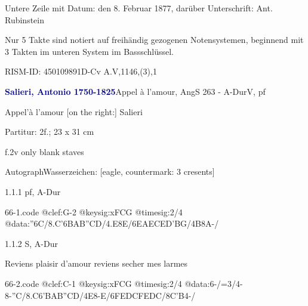 \documentclass[a4paper, twocolumn, 11pt]{book}
\begin{document}
\newline %
\par Untere Zeile mit Datum: {\textquotedbl}den 8. Februar 1877{\textquotedbl}, darüber Unterschrift: {\textquotedbl}Ant. Rubinstein{\textquotedbl}
\par Nur 5 Takte sind notiert auf freihändig gezogenen Notensystemen, beginnend mit 3 Takten im unteren System im Bassschlüssel.
\par RISM-ID: 450109891\newline D-Cv  A.V,1146,(3),1
\par \vspace{16pt} \textcolor{darkblue}{\textbf{Salieri, Antonio  1750-1825}}\hfillplus{[66]}\newline Appel à l'amour, AngS 263 - A-Dur\newline V, pf
\par \begin{itshape}[heading:] Appel'à l'amour [on the right:] Salieri\end{itshape} 
\par \textcolor{darkblue}{}  Partitur: 2f.; 23 x 31 cm\newline \begin{small} f.2v only blank staves\end{small} \newline Autograph\newline Wasserzeichen: [eagle, countermark: 3 cresents]
\par 1.1.1  pf, A-Dur  
\begin{filecontents*}{66-1.code}
@clef:G-2
@keysig:xFCG
@timesig:2/4
@data:''6C/{8.C'6B}{AB''CD}/4.E8E/6{EAEC}{ED'BG}/4B8A-/
\end{filecontents*}

\newline %
\par 1.1.2  S, A-Dur\newline \begin{footnotesize} Reviens plaisir d'amour reviens secher mes larmes \end{footnotesize}  
\begin{filecontents*}{66-2.code}
@clef:C-1
@keysig:xFCG
@timesig:2/4
@data:6-/=3/4-8-''C/8.C6'B{AB}{''CD}/4E8-E/{6FE}{DC}{FE}{DC}/8C'B4-/
\end{filecontents*}
\end{document}
